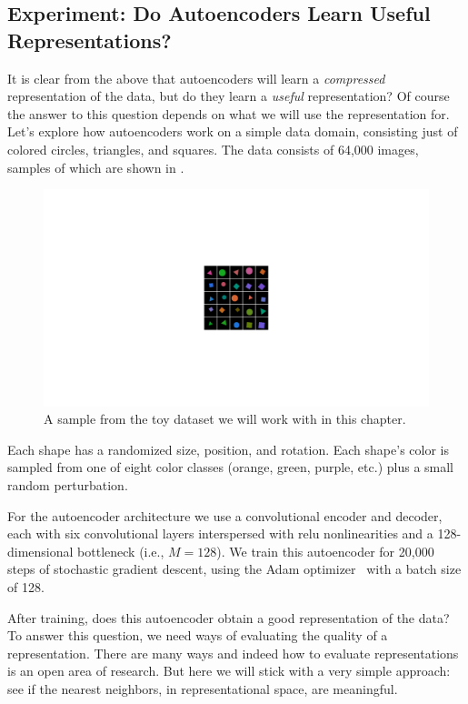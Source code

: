\subsection{Experiment: Do Autoencoders Learn Useful Representations?}
It is clear from the above that autoencoders will learn a \textit{compressed} representation of the data, but do they learn a \textit{useful} representation? Of course the answer to this question depends on what we will use the representation for. Let's explore how autoencoders work on a simple data domain, consisting just of colored circles, triangles, and squares. The data consists of 64,000 images, samples of which are shown in \fig{\ref{fig:representation_learning:shapes_dataset_random_samples}}.
\begin{figure}[h!]
    \centerline{
        \includegraphics[width=0.275\linewidth]{figures/representation_learning/shapes_dataset_random_samples.pdf}
    }
    \caption{A sample from the toy dataset we will work with in this chapter.}
    \vspace{-1.0em}
    \label{fig:representation_learning:shapes_dataset_random_samples}
\end{figure}

Each shape has a randomized size, position, and rotation. Each shape's color is sampled from one of eight color classes (orange, green, purple, etc.) plus a small random perturbation.

For the autoencoder architecture we use a convolutional encoder and decoder, each with six convolutional layers interspersed with relu nonlinearities and a 128-dimensional bottleneck (i.e., $M=128$). We train this autoencoder for 20,000 steps of stochastic gradient descent, using the Adam optimizer~\cite{kingma2014adam} with a batch size of 128.

After training, does this autoencoder obtain a good representation of the data? To answer this question, we need ways of evaluating the quality of a representation. There are many ways and indeed how to evaluate representations is an open area of research. But here we will stick with a very simple approach: see if the nearest neighbors, in representational space, are meaningful.

